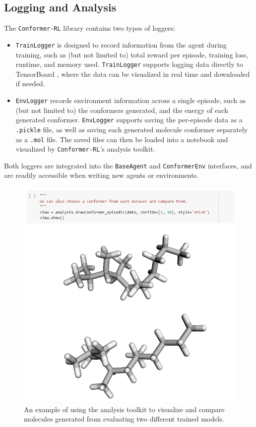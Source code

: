 \documentclass[twoside,11pt]{article}
\newcommand{\code}[1]{\texttt{#1}}
\newcommand{\titleofpaper}{Conformer-RL}
\begin{document}
\subsection{Logging and Analysis}
The \code{\titleofpaper} library contains two types of loggers:
\begin{itemize}
  \item \code{TrainLogger} is designed to record information from the agent during training, such as (but not limited to) total reward per episode, training loss, runtime, and memory used. \code{TrainLogger} supports logging data directly to TensorBoard \citep{tensorflow2015-whitepaper}, where the data can be visualized in real time and downloaded if needed.
  \item \code{EnvLogger} records environment information across a single episode, such as (but not limited to) the conformers generated, and the energy of each generated conformer. \code{EnvLogger} supports saving the per-episode data as a \code{.pickle} file, as well as saving each generated molecule conformer separately as a \code{.mol} file. The saved files can then be loaded into a notebook and visualized by \code{\titleofpaper}'s analysis toolkit.
\end{itemize}
Both loggers are integrated into the \code{BaseAgent} and \code{ConformerEnv} interfaces, and are readily accessible when writing new agents or environments.

\begin{figure}[h]
  \centering
  \includegraphics[scale=0.7]{molecules.png}
  \caption{
    An example of using the analysis toolkit to visualize and compare molecules generated from evaluating two different trained models. 
  }
  \label{fig:molecules}
\end{figure}
\end{document}
